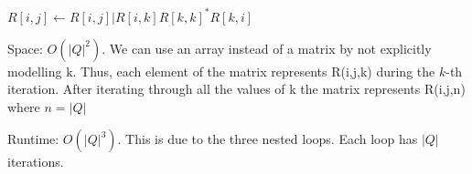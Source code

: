 \begin{enumerate}[(a)]
\begin{algorithm}[H]
\begin{algorithmic}
					\State $R[i,j] \gets R[i,j] | R[i, k]R[k,k]^{*}R[k,i]$
				\EndFor
			\EndFor
		\EndFor
	  \EndFunction
	\end{algorithmic}
\end{algorithm}

Space: $O(|Q|^2)$. We can use an array instead of a matrix by not explicitly modelling k.
Thus, each element of the matrix represents R(i,j,k) during the $k$-th iteration.
After iterating through all the values of k the matrix represents R(i,j,n) where $n=|Q|$

Runtime: $O(|Q|^3)$. This is due to the three nested loops. Each loop has $|Q|$ iterations.

\end{enumerate}